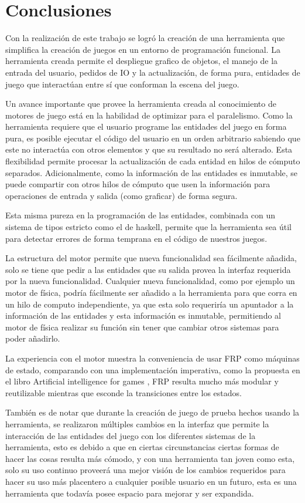 
\chapter{Conclusiones}

Con la realización de este trabajo se logró la creación de una herramienta que simplifica la creación de juegos en un entorno de programación funcional. La herramienta creada permite el despliegue grafico de objetos, el manejo de la entrada del usuario, pedidos de IO y la actualización, de forma pura, entidades de juego que interactúan entre sí que conforman la escena del juego.

Un avance importante que provee la herramienta creada al conocimiento de motores de juego está en la habilidad de optimizar para el paralelismo. Como la herramienta requiere que el usuario programe las entidades del juego en forma pura, es posible ejecutar el código del usuario en un orden arbitrario sabiendo que este no interactúa con otros elementos y que su resultado no será alterado. Esta flexibilidad permite procesar la actualización de cada entidad en hilos de cómputo separados. Adicionalmente, como la información de las entidades es inmutable, se puede compartir con otros hilos de cómputo que usen la información para operaciones de entrada y salida (como graficar) de forma segura.

Esta misma pureza en la programación de las entidades, combinada con un sistema de tipos estricto como el de haskell, permite que la herramienta sea útil para detectar errores de forma temprana en el código de nuestros juegos.

La estructura del motor permite que nueva funcionalidad  sea fácilmente añadida, solo se tiene que pedir a las entidades que su salida provea la interfaz requerida por la nueva funcionalidad. Cualquier nueva funcionalidad, como por ejemplo un motor de física, podría fácilmente ser añadido a la herramienta para que corra en un hilo de computo independiente, ya que esta solo requeriría un apuntador a la información de las entidades y esta información es inmutable, permitiendo al motor de física realizar su función sin tener que cambiar otros sistemas para poder añadirlo.

La experiencia con el motor muestra la conveniencia de usar FRP como máquinas de estado, comparando con una implementación imperativa, como la propuesta en el libro Artificial intelligence for games \cite{millington2016artificial}, FRP resulta mucho más modular y reutilizable mientras que esconde la transiciones entre los estados.

También es de notar que durante la creación de juego de prueba hechos usando la herramienta, se realizaron múltiples cambios en la interfaz que permite la interacción de las entidades del juego con los diferentes sistemas de la herramienta, esto es debido a que en ciertas circunstancias ciertas formas de hacer las cosas resulta más cómodo, y con una herramienta tan joven como esta, solo su uso continuo proveerá una mejor visión de los cambios requeridos para hacer su uso más placentero a cualquier posible usuario en un futuro, esta es una herramienta que todavía posee espacio para mejorar y ser expandida.
